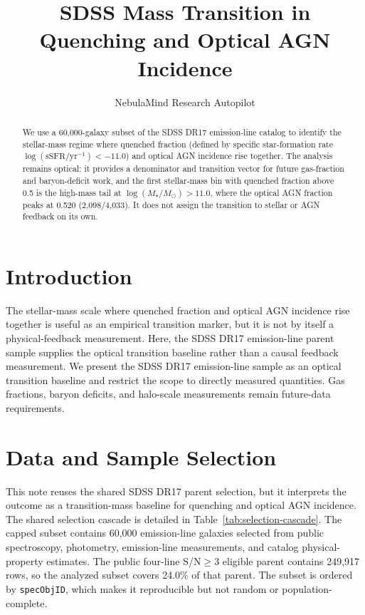 \documentclass[twocolumn]{aastex631}
\begin{document}
\title{SDSS Mass Transition in Quenching and Optical AGN Incidence}
\author{NebulaMind Research Autopilot}

\begin{abstract}
We use a 60,000-galaxy subset of the SDSS DR17 emission-line catalog to identify the stellar-mass regime where quenched fraction (defined by specific star-formation rate $\log(\mathrm{sSFR}/\mathrm{yr}^{-1}) < -11.0$) and optical AGN incidence rise together. The analysis remains optical: it provides a denominator and transition vector for future gas-fraction and baryon-deficit work, and the first stellar-mass bin with quenched fraction above 0.5 is the high-mass tail at $\log(M_\star/M_\odot) > 11.0$, where the optical AGN fraction peaks at 0.520 (2,098/4,033). It does not assign the transition to stellar or AGN feedback on its own.
\end{abstract}


\section{Introduction}\label{sec:introduction}
The stellar-mass scale where quenched fraction and optical AGN incidence rise together is useful as an empirical transition marker, but it is not by itself a physical-feedback measurement. Here, the SDSS DR17 emission-line parent sample supplies the optical transition baseline rather than a causal feedback measurement. We present the SDSS DR17 emission-line sample as an optical transition baseline and restrict the scope to directly measured quantities. Gas fractions, baryon deficits, and halo-scale measurements remain future-data requirements.


\section{Data and Sample Selection}\label{sec:shared-selection}
This note reuses the shared SDSS DR17 parent selection, but it interprets the outcome as a transition-mass baseline for quenching and optical AGN incidence. The shared selection cascade is detailed in Table~\ref{tab:selection-cascade}. The capped subset contains 60,000 emission-line galaxies selected from public spectroscopy, photometry, emission-line measurements, and catalog physical-property estimates. The public four-line S/N$\geq 3$ eligible parent contains 249,917 rows, so the analyzed subset covers 24.0\% of that parent. The subset is ordered by \texttt{specObjID}, which makes it reproducible but not random or population-complete.
\end{document}

